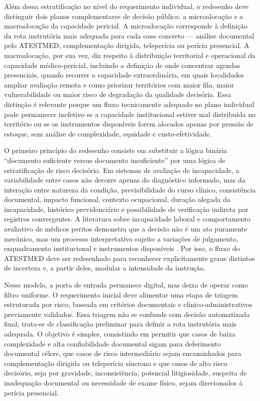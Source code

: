 \documentclass[12pt,a4paper]{article}
\begin{document}
Além dessa estratificação no nível do requerimento individual, o redesenho deve distinguir dois planos complementares de decisão pública: a microalocação e a macroalocação da capacidade pericial. A microalocação corresponde à definição da rota instrutória mais adequada para cada caso concreto — análise documental pelo ATESTMED, complementação dirigida, teleperícia ou perícia presencial. A macroalocação, por sua vez, diz respeito à distribuição territorial e operacional da capacidade médico-pericial, incluindo a definição de onde concentrar agendas presenciais, quando recorrer a capacidade extraordinária, em quais localidades ampliar avaliação remota e como priorizar territórios com maior fila, maior vulnerabilidade ou maior risco de degradação da qualidade decisória. Essa distinção é relevante porque um fluxo tecnicamente adequado no plano individual pode permanecer inefetivo se a capacidade institucional estiver mal distribuída no território ou se os instrumentos disponíveis forem alocados apenas por pressão de estoque, sem análise de complexidade, equidade e custo-efetividade.

O primeiro princípio do redesenho consiste em substituir a lógica binária “documento suficiente versus documento insuficiente” por uma lógica de estratificação de risco decisório. Em sistemas de avaliação de incapacidade, a variabilidade entre casos não decorre apenas do diagnóstico informado, mas da interação entre natureza da condição, previsibilidade do curso clínico, consistência documental, impacto funcional, contexto ocupacional, duração alegada da incapacidade, histórico previdenciário e possibilidade de verificação indireta por registros convergentes. A literatura sobre incapacidade laboral e comportamento avaliativo de médicos peritos demonstra que a decisão não é um ato puramente mecânico, mas um processo interpretativo sujeito a variações de julgamento, enquadramento institucional e instrumentos disponíveis \parencite{steenbeek2011thedevelopmentofinstrumentstomeasuretheworkdisa, dijkstrasdatamakingupincapacityforwork}. Por isso, o fluxo do ATESTMED deve ser redesenhado para reconhecer explicitamente graus distintos de incerteza e, a partir deles, modular a intensidade da instrução.

Nesse modelo, a porta de entrada permanece digital, mas deixa de operar como filtro uniforme. O requerimento inicial deve alimentar uma etapa de triagem estruturada por risco, baseada em critérios documentais e clínico-administrativos previamente validados. Essa triagem não se confunde com decisão automatizada final; trata-se de classificação preliminar para definir a rota instrutória mais adequada. O objetivo é simples, consistindo em permitir que casos de baixa complexidade e alta confiabilidade documental sigam para deferimento documental célere, que casos de risco intermediário sejam encaminhados para complementação dirigida ou teleperícia síncrona e que casos de alto risco decisório, seja por gravidade, inconsistência, potencial litigiosidade, suspeita de inadequação documental ou necessidade de exame físico, sejam direcionados à perícia presencial.
\end{document}
